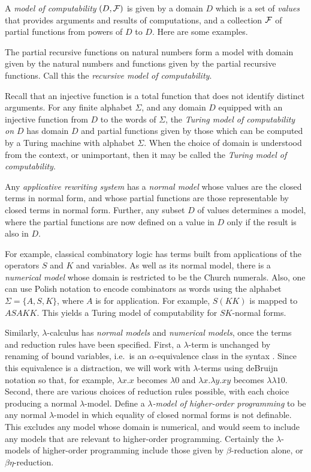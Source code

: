 \documentclass[a4paper]{article}
\begin{document}
A {\em model of computability} $(D, {\cal F})$ is given by a domain
$D$ which is a set of {\em values} that provides arguments and results
of computations, and a collection ${\cal F}$ of partial functions from
powers of $D$ to $D$.  Here are some examples.

The partial recursive functions on natural numbers form a model with
domain given by the natural numbers and functions given by
the partial recursive functions. Call this the {\em recursive model of
  computability}.

Recall that an injective function is a total function that does not
identify distinct arguments.  For any finite alphabet $\Sigma$, and any
domain $D$ equipped with an injective function from $D$ to the words
of $\Sigma$, the {\em Turing model of computability on $D$} has domain
$D$ and partial functions given by those which can be computed by a
Turing machine with alphabet $\Sigma$.  When the choice of domain is
understood from the context, or unimportant, then it may be called the
{\em Turing model of computability}.

Any {\em applicative rewriting system} \cite{TRS} 
has a {\em normal model} whose values are the closed terms in normal form,
and whose partial functions are those representable by  closed terms
in normal form. Further, any subset $D$ of values determines a model,
where the partial functions are now defined on a value in $D$ only if
the result is also in $D$. 

For example, classical combinatory logic has terms built from
applications of the operators $S$ and $K$ and variables.  As well
as its normal model, there is a {\em numerical model} whose domain is
restricted to be the Church numerals. Also, one can use Polish
notation to encode combinators as words using the alphabet $\Sigma =
\{A,S,K\}$, where $A$ is for application. For example, $S(KK)$ is
mapped to $ASAKK$. This yields a Turing model of computability for
$SK$-normal forms.

Similarly, $\lambda$-calculus has {\em normal models} and {\em numerical
  models}, once the terms and reduction rules have been specified.
First, a $\lambda$-term is unchanged by renaming of bound variables, i.e.\
is an $\alpha$-equivalence class in the syntax \cite{Bare84a}. Since
this equivalence is a distraction, we will work with $\lambda$-terms using
deBruijn notation \cite{deBruijn} so that, for example, $\lambda x.x $
becomes $\lambda 0$ and $\lambda x. \lambda y. x y$ becomes $\lambda \lambda 1 0$. Second,
there are various choices of reduction rules possible, with each
choice producing a normal $\lambda$-model.  Define a {\em $\lambda$-model of
  higher-order programming} to be any normal $\lambda$-model in which
equality of closed normal forms is not definable.  This excludes
any model whose domain is numerical, and would seem to include any models
that are relevant to higher-order programming.  Certainly the
$\lambda$-models of higher-order programming include those given by
$\beta$-reduction alone, or $\beta\eta$-reduction.
\end{document}
